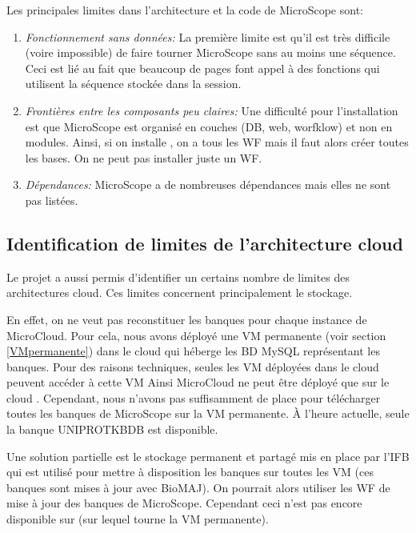 Les principales limites dans l'architecture et la code de MicroScope sont:
\begin{enumerate}
    \item \emph{Fonctionnement sans données:} La première limite est
    qu'il est très difficile (voire impossible) de faire tourner MicroScope sans au moins une séquence.
    Ceci est lié au fait que beaucoup de pages font appel à des fonctions qui utilisent la séquence stockée dans la session.
    \item \emph{Frontières entre les composants peu claires:} Une difficulté pour l'installation est que MicroScope est organisé en couches (DB, web, worfklow) et non en modules.
    Ainsi, si on installe , on a tous les WF mais il faut alors créer toutes les bases.
    On ne peut pas installer juste un WF.
    \item \emph{Dépendances:} MicroScope a de nombreuses dépendances mais elles ne sont pas listées.
\end{enumerate}

\subsection{Identification de limites de l'architecture cloud} \label{subsec:limites_coud}

Le projet a aussi permis d'identifier un certains nombre de limites des architectures cloud.
Ces limites concernent principalement le stockage.

En effet, on ne veut pas reconstituer les banques pour chaque instance de MicroCloud.
Pour cela, nous  avons déployé une VM permanente (voir section \ref{VMpermanente}) dans le cloud 
qui héberge les BD MySQL représentant les banques.
Pour des raisons techniques, seules les VM déployées dans le cloud 
peuvent accéder à cette VM
Ainsi MicroCloud ne peut être déployé que sur le cloud .
Cependant, nous n'avons pas suffisamment de place pour télécharger toutes les banques de MicroScope sur la VM permanente.
À l'heure actuelle, seule la banque UNIPROTKBDB est disponible.

Une solution partielle est le stockage permanent et partagé mis en place par l'IFB
qui est utilisé pour mettre à disposition les banques sur toutes les VM (ces banques sont mises à jour avec BioMAJ).
On pourrait alors utiliser les WF de mise à jour des banques de MicroScope.
Cependant ceci n'est pas encore disponible sur  (sur lequel tourne la VM permanente).

